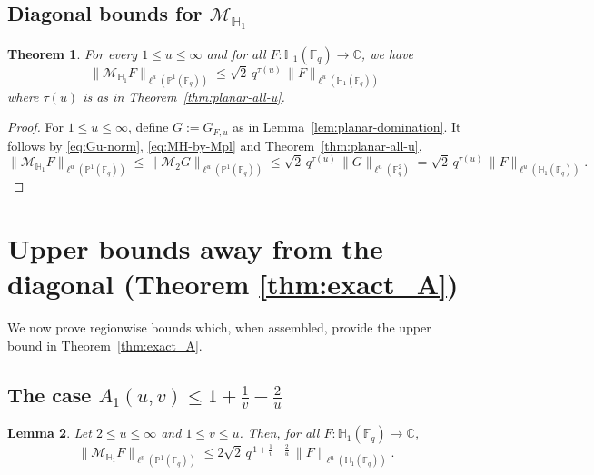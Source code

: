 \documentclass[11pt]{article}
\newtheorem{theorem}{Theorem}[section]
\newtheorem{lemma}[theorem]{Lemma}
\newcommand{\1}{\mathbf 1}
\begin{document}
\subsection{Diagonal bounds for $\mathcal{M}_{\mathbb{H}_1}$}

\begin{theorem}
\label{thm:diag}
For every $1\le u\le \infty$ and for all $F:\mathbb{H}_1(\mathbb{F}_q)\to \mathbb{C}$, we have 
\[
\|\mathcal{M}_{\mathbb{H}_1} F\|_{\ell^u(\mathbb{P}^1(\mathbb{F}_q))}
\le  \sqrt{2} \, q^{\tau(u)}\, 
\|F\|_{\ell^u(\mathbb{H}_1(\mathbb{F}_q))}
\]
 where $\tau(u)$ is as in Theorem~\ref{thm:planar-all-u}.
\end{theorem}

\begin{proof}
For $1\le u\leq \infty$, define $G:=G_{F,u}$ as in Lemma~\ref{lem:planar-domination}. It follows by \eqref{eq:Gu-norm}, \eqref{eq:MH-by-Mpl} and Theorem~\ref{thm:planar-all-u},
\[
\|\mathcal{M}_{\mathbb{H}_1} F\|_{\ell^u(\mathbb{P}^1(\mathbb{F}_q))}
\le
\|\mathcal{M}_{2}G\|_{\ell^u(\mathbb{P}^1(\mathbb{F}_q))}
\le \sqrt{2} \,q^{\tau(u)}\,\|G\|_{\ell^u(\mathbb{F}_q^2)}=\sqrt{2} \, q^{\tau(u)}\, 
\|F\|_{\ell^u(\mathbb{H}_1(\mathbb{F}_q))}.
\]
\end{proof}




\section{Upper bounds away from the diagonal (Theorem \ref{thm:exact_A})}\label{section4}

We now prove regionwise bounds which, when assembled, provide the upper bound in Theorem~\ref{thm:exact_A}.



\subsection{The case $A_1(u, v)\le 1+\frac{1}{v}-\frac{2}{u}$}

\begin{lemma}\label{thm:upper-left}
Let $2\le u\le \infty$ and $1\le v\le u$. Then, for all
$F:\mathbb{H}_1(\mathbb{F}_q)\to\mathbb{C}$, 
\[
\|\mathcal{M}_{\mathbb{H}_1} F\|_{\ell^v(\mathbb{P}^1(\mathbb{F}_q))}
\le 2\sqrt{2}
\,q^{\,1+\frac1v-\frac{2}{u}}\,
\|F\|_{\ell^u(\mathbb{H}_1(\mathbb{F}_q))}.
\]
\end{lemma}
\end{document}
